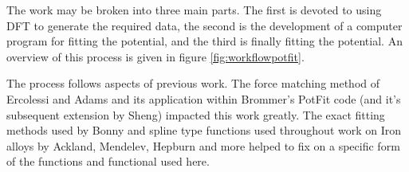 The work may be broken into three main parts.  The first is devoted to using DFT to generate the required data, the second is the development of a computer program for fitting the potential, and the third is finally fitting the potential.  An overview of this process is given in figure \ref{fig:workflowpotfit}.

The process follows aspects of previous work.  The force matching method of Ercolessi and Adams\cite{forcematchingmethod} and its application within Brommer's PotFit code\cite{pbrommer} (and it's subsequent extension by Sheng\cite{shengeam}) impacted this work greatly.  The exact fitting methods used by Bonny and spline type functions used throughout work on Iron alloys by Ackland, Mendelev, Hepburn and more helped to fix on a specific form of the functions and functional used here.

